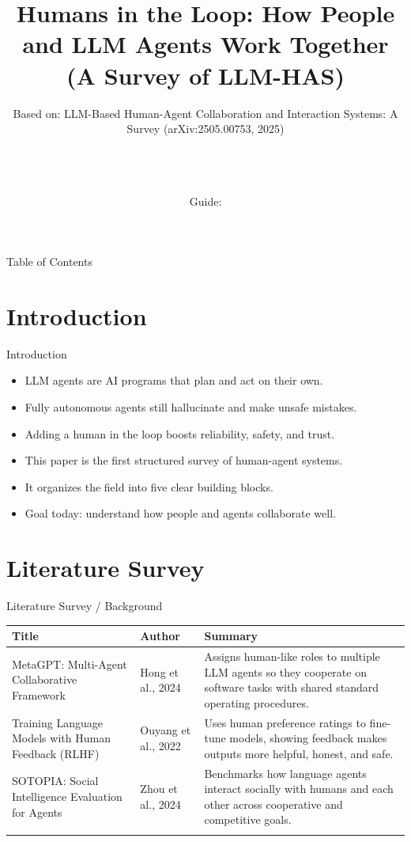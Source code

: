 \documentclass[10pt]{beamer}
\title[B.Tech Seminar]{Humans in the Loop: How People and LLM Agents Work Together (A Survey of LLM-HAS)}
\subtitle{Based on: LLM-Based Human-Agent Collaboration and Interaction Systems: A Survey (arXiv:2505.00753, 2025)}
\author[\studentname\ (\shortinst)]{\studentname \\ \small \rollno \\ \small \rollclass \\ \small Guide: \guidename}
\institute[]{\deptname \\ \collegename}
\date{\seminardate}
\begin{document}
\begin{frame}[plain]
  \titlepage
\end{frame}
\begin{frame}{Table of Contents}
  \tableofcontents
\end{frame}
\section{Introduction}
\begin{frame}{Introduction}
\begin{itemize}
  \item LLM agents are AI programs that plan and act on their own.
  \item Fully autonomous agents still hallucinate and make unsafe mistakes.
  \item Adding a human in the loop boosts reliability, safety, and trust.
  \item This paper is the first structured survey of human-agent systems.
  \item It organizes the field into five clear building blocks.
  \item Goal today: understand how people and agents collaborate well.
\end{itemize}
\end{frame}
\section{Literature Survey}
\begin{frame}{Literature Survey / Background}
  \small
  \begin{tabular}{@{}p{2.7cm}p{2.3cm}p{5.6cm}@{}}
    \toprule
    \textbf{Title} & \textbf{Author} & \textbf{Summary} \\
    \midrule
    MetaGPT: Multi-Agent Collaborative Framework & Hong et al., 2024 & Assigns human-like roles to multiple LLM agents so they cooperate on software tasks with shared standard operating procedures. \\
    \addlinespace
    Training Language Models with Human Feedback (RLHF) & Ouyang et al., 2022 & Uses human preference ratings to fine-tune models, showing feedback makes outputs more helpful, honest, and safe. \\
    \addlinespace
    SOTOPIA: Social Intelligence Evaluation for Agents & Zhou et al., 2024 & Benchmarks how language agents interact socially with humans and each other across cooperative and competitive goals. \\
    \addlinespace
    \bottomrule
  \end{tabular}
\end{frame}
\end{document}
